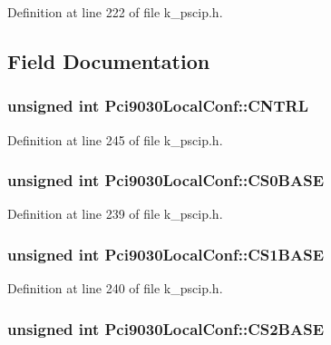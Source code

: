 Definition at line 222 of file k\_\-pscip.h.

\subsection{Field Documentation}
\hypertarget{struct_pci9030_local_conf_1627b4c057c764efd4ba2f457bb6e849}{
\subsubsection[{CNTRL}]{\setlength{\rightskip}{0pt plus 5cm}unsigned int {\bf Pci9030LocalConf::CNTRL}}}
\label{struct_pci9030_local_conf_1627b4c057c764efd4ba2f457bb6e849}




Definition at line 245 of file k\_\-pscip.h.\hypertarget{struct_pci9030_local_conf_fe4767e14f663d7a001d9ca2077de9e8}{
\subsubsection[{CS0BASE}]{\setlength{\rightskip}{0pt plus 5cm}unsigned int {\bf Pci9030LocalConf::CS0BASE}}}
\label{struct_pci9030_local_conf_fe4767e14f663d7a001d9ca2077de9e8}




Definition at line 239 of file k\_\-pscip.h.\hypertarget{struct_pci9030_local_conf_5534ac4d99c87f6c5bf9c7ae32470bff}{
\subsubsection[{CS1BASE}]{\setlength{\rightskip}{0pt plus 5cm}unsigned int {\bf Pci9030LocalConf::CS1BASE}}}
\label{struct_pci9030_local_conf_5534ac4d99c87f6c5bf9c7ae32470bff}




Definition at line 240 of file k\_\-pscip.h.\hypertarget{struct_pci9030_local_conf_5bc7f14fd02d0148520086aa958d8d61}{
\subsubsection[{CS2BASE}]{\setlength{\rightskip}{0pt plus 5cm}unsigned int {\bf Pci9030LocalConf::CS2BASE}}}
\label{struct_pci9030_local_conf_5bc7f14fd02d0148520086aa958d8d61}




